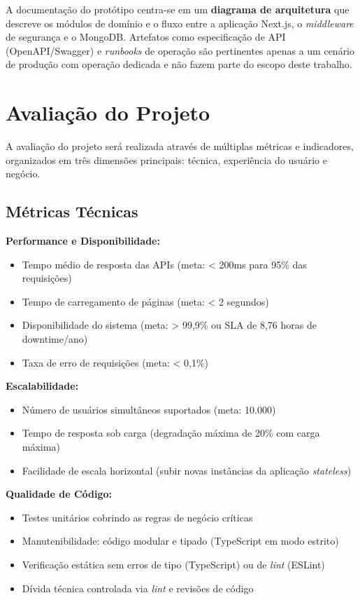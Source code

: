 A documentação do protótipo centra-se em um \textbf{diagrama de arquitetura} que descreve os módulos de domínio e o fluxo entre a aplicação Next.js, o \textit{middleware} de segurança e o MongoDB. Artefatos como especificação de API (OpenAPI/Swagger) e \textit{runbooks} de operação são pertinentes apenas a um cenário de produção com operação dedicada e não fazem parte do escopo deste trabalho.

\section{Avaliação do Projeto}

A avaliação do projeto será realizada através de múltiplas métricas e indicadores, organizados em três dimensões principais: técnica, experiência do usuário e negócio.

\subsection{Métricas Técnicas}

\textbf{Performance e Disponibilidade:}
\begin{itemize}
    \item Tempo médio de resposta das APIs (meta: < 200ms para 95\% das requisições)
    \item Tempo de carregamento de páginas (meta: < 2 segundos)
    \item Disponibilidade do sistema (meta: > 99,9\% ou SLA de 8,76 horas de downtime/ano)
    \item Taxa de erro de requisições (meta: < 0,1\%)
\end{itemize}

\textbf{Escalabilidade:}
\begin{itemize}
    \item Número de usuários simultâneos suportados (meta: 10.000)
    \item Tempo de resposta sob carga (degradação máxima de 20\% com carga máxima)
    \item Facilidade de escala horizontal (subir novas instâncias da aplicação \textit{stateless})
\end{itemize}

\textbf{Qualidade de Código:}
\begin{itemize}
    \item Testes unitários cobrindo as regras de negócio críticas
    \item Manutenibilidade: código modular e tipado (TypeScript em modo estrito)
    \item Verificação estática sem erros de tipo (TypeScript) ou de \textit{lint} (ESLint)
    \item Dívida técnica controlada via \textit{lint} e revisões de código
\end{itemize}

